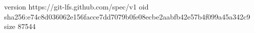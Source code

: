 version https://git-lfs.github.com/spec/v1
oid sha256:e74c8d036062e156facce7dd7079b0fe08ecbe2aabfb42e57b4f099a45a342c9
size 87544
